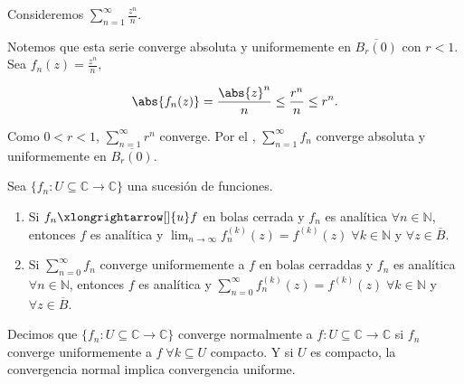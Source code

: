\documentclass[../main.tex]{subfiles}
\begin{document}
\begin{example}
    Consideremos \(\sum_{n = 1}^{\infty}\frac{z^{n}}{n}\).

    Notemos que esta serie converge absoluta y uniformemente en
    \(\overline{B_{r}(0)}\) con
    \(r < 1\).
    Sea \(f_{n}(z) = \frac{z^{n}}{n}\),

    \begin{equation*}
        \abs{f_{n}(z)} = \dfrac{\abs{z}^{n}}{n} \leq \dfrac{r^{n}}{n} \leq r^{n}.
    \end{equation*}

    Como \(0 < r < 1\), \(\sum_{n = 1}^{\infty}r^{n}\) converge. Por el
    , \(\sum_{n =
    1}^{\infty}f_{n}\) converge absoluta y uniformemente en \(\overline{B_{r}(0)}\).
\end{example}


\begin{theorem}[de Weierstrass]\label{thm:deWeierstrass}
    Sea \(\{f_{n} \colon U \subseteq \mathbb{C} \to \mathbb{C}\}\) una sucesión de
    funciones.

    \begin{enumerate}
        \item Si \(f_{n} \xlongrightarrow[]{u} f\) en bolas cerrada y
            \(f_{n}\) es analítica
            \(\forall n\in \mathbb{N}\), entonces \(f\) es analítica y
            \(\lim_{n \to \infty}
            f_{n}^{(k)}(z) = f^{(k)}(z)\; \forall k\in \mathbb{N}\) y \(\forall z\in
            \overline{B}\).
        \item Si \(\sum_{n = 0}^{\infty}f_{n}\) converge uniformemente a \(f\) en bolas
            cerraddas y \(f_{n}\) es analítica \(\forall n\in \mathbb{N}\),
            entonces \(f\)
            es analítica y \(\sum_{n = 0}^{\infty}f_{n}^{(k)}(z) =
                f^{(k)}(z)\; \forall k\in
            \mathbb{N}\) y \(\forall z\in \overline{B}\).
    \end{enumerate}
\end{theorem}

\begin{definition}
    Decimos que \(\{f_{n} \colon U \subseteq \mathbb{C} \to \mathbb{C}\}\) converge
    normalmente a \(f \colon U \subseteq \mathbb{C} \to \mathbb{C}\) si \(f_{n}\)
    converge uniformemente a \(f\; \forall k \subseteq U\) compacto. Y si \( U\) es
    compacto, la convergencia normal implica convergencia uniforme.
\end{definition}
\end{document}
